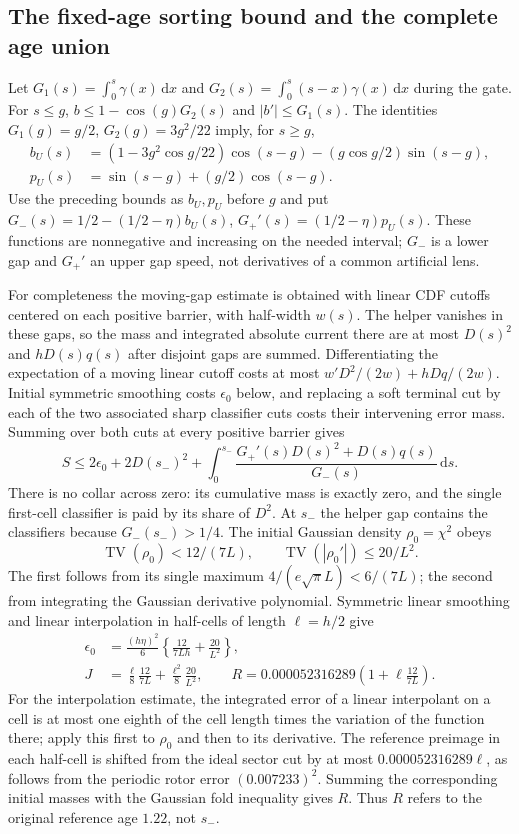 \documentclass[11pt]{article}
\theoremstyle{definition}\newtheorem{definition}[theorem]{Definition}
\theoremstyle{remark}\newtheorem{remark}[theorem]{Remark}
\newcommand{\TV}{\operatorname{TV}}\newcommand{\Var}{\operatorname{Var}}
\newcommand{\dd}{\,\mathrm d}\newcommand{\Imv}{\operatorname{Im}}\newcommand{\ii}{\mathrm i}
\begin{document}
\subsection{The fixed-age sorting bound and the complete age union}
\label{old:endpoint}
Let $G_1(s)=\int_0^s\gamma(x)\dd x$ and
$G_2(s)=\int_0^s(s-x)\gamma(x)\dd x$ during the gate.
For $s\leq g$, $b\leq1-\cos(g)G_2(s)$ and $|b'|\leq G_1(s)$.
The identities $G_1(g)=g/2$, $G_2(g)=3g^2/22$ imply, for $s\geq g$,
\begin{align*}
 b_U(s)&=(1-3g^2\cos g/22)\cos(s-g)
                          -(g\cos g/2)\sin(s-g),\\
 p_U(s)&=\sin(s-g)+(g/2)\cos(s-g).
\end{align*}
Use the preceding bounds as $b_U,p_U$ before $g$ and put
$G_-(s)=1/2-(1/2-\eta)b_U(s)$,
$G_+'(s)=(1/2-\eta)p_U(s)$.
These functions are nonnegative and increasing on the needed interval;
$G_-$ is a lower gap and $G_+'$ an upper gap speed, not derivatives
of a common artificial lens.

For completeness the moving-gap estimate is obtained with linear CDF
cutoffs centered on each positive barrier, with half-width $w(s)$.
The helper vanishes in these gaps, so the mass and integrated absolute
current there are at most $D(s)^2$ and $hD(s)q(s)$ after disjoint gaps
are summed. Differentiating the expectation of a moving linear cutoff
costs at most $w'D^2/(2w)+hDq/(2w)$. Initial symmetric smoothing costs
$\epsilon_0$ below, and replacing a soft terminal cut by each of the two
associated sharp classifier cuts costs their intervening error mass.
Summing over both cuts at every positive barrier gives
\begin{equation}
 S\leq2\epsilon_0+2D(s_-)^2+
     \int_0^{s_-}\frac{G_+'(s)D(s)^2+D(s)q(s)}{G_-(s)}\dd s.
 \label{old:sorting}
\end{equation}
There is no collar across zero: its cumulative mass is exactly zero, and
the single first-cell classifier is paid by its share of $D^2$.
At $s_-$ the helper gap contains the classifiers because $G_-(s_-)>1/4$.
The initial Gaussian density $\rho_0=\chi^2$ obeys
\[
 \TV(\rho_0)<12/(7L),\qquad \TV(|\rho_0'|)\leq20/L^2.
\]
The first follows from its single maximum
$4/(e\sqrt\pi L)<6/(7L)$; the second from integrating the
Gaussian derivative polynomial. Symmetric linear smoothing and linear
interpolation in half-cells of length $\ell=h/2$ give
\begin{align*}
 \epsilon_0&=\frac{(h\eta)^2}{6}
       \left\{\frac{12}{7Lh}+\frac{20}{L^2}\right\},\\
 J&=\frac\ell8\frac{12}{7L}+\frac{\ell^2}8\frac{20}{L^2},\qquad
 R=0.000052316289\left(1+\ell\frac{12}{7L}\right).
\end{align*}
For the interpolation estimate, the integrated error of a linear
interpolant on a cell is at most one eighth of the cell length times
the variation of the function there; apply this first to $\rho_0$ and
then to its derivative. The reference preimage in each half-cell is
shifted from the ideal sector cut by at most
$0.000052316289\ell$, as follows from the periodic rotor error
$(0.007233)^2$. Summing the corresponding initial masses with the
Gaussian fold inequality gives $R$.
Thus $R$ refers to the original reference age $1.22$, not $s_-$.
\end{document}
